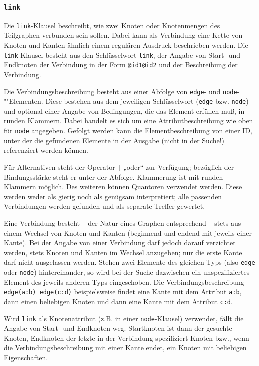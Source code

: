 \documentclass[12pt]{scrartcl}
\begin{document}
\subsubsection{\texttt{link}}\label{link}

Die \texttt{link}-Klausel beschreibt, wie zwei Knoten oder Knotenmengen des Teilgraphen verbunden sein sollen. Dabei kann als Verbindung eine Kette von Knoten und Kanten ähnlich einem regulären Ausdruck beschrieben werden.
Die \texttt{link}-Klausel besteht aus den Schlüsselwort \texttt{link}, der Angabe von Start- und Endknoten der Verbindung in der Form \texttt{@id1@id2} und der Beschreibung der Verbindung.

Die Verbindungsbeschreibung besteht aus einer Abfolge von \texttt{edge}- und \texttt{node}-""Elementen. Diese bestehen aus dem jeweiligen Schlüsselwort (\texttt{edge} bzw. \texttt{node}) und optional einer Angabe von Bedingungen, die das Element erfüllen muß, in runden Klammern. Dabei handelt es sich um eine Attributbeschreibung wie oben für \texttt{node} angegeben. Gefolgt werden kann die Elementbeschreibung von einer ID, unter der die gefundenen Elemente in der Ausgabe (nicht in der Suche!) referenziert werden können.

Für Alternativen steht der Operator \texttt{|} „oder“ zur Verfügung; bezüglich der Bindungsstärke steht er unter der Abfolge. Klammerung ist mit runden Klammern möglich. Des weiteren können Quantoren verwendet werden. Diese werden weder als gierig noch als genügsam interpretiert; alle  passenden Verbindungen werden gefunden und als separate Treffer gewertet.

Eine Verbindung besteht – der Natur eines Graphen entsprechend – stets aus einem Wechsel von Knoten und Kanten (beginnend und endend mit jeweils einer Kante). Bei der Angabe von einer Verbindung darf jedoch darauf verzichtet werden, stets Knoten und Kanten im Wechsel anzugeben; nur die erste Kante darf nicht ausgelassen werden. Stehen zwei Elemente des gleichen Typs (also \texttt{edge} oder \texttt{node}) hintereinander, so wird bei der Suche dazwischen ein unspezifiziertes Element des jeweils anderen Typs eingeschoben. Die Verbindungsbeschreibung \texttt{edge(a:b) edge(c:d)} beispielsweise findet eine Kante mit dem Attribut \texttt{a:b}, dann einen beliebigen Knoten und dann eine Kante mit dem Attribut \texttt{c:d}.

Wird \texttt{link} als Knotenattribut (z.B. in einer \texttt{node}-Klausel) verwendet, fällt die Angabe von Start- und Endknoten weg. Startknoten ist dann der gesuchte Knoten, Endknoten der letzte in der Verbindung spezifiziert Knoten bzw., wenn die Verbindungsbeschreibung mit einer Kante endet, ein Knoten mit beliebigen Eigenschaften.
\end{document}
